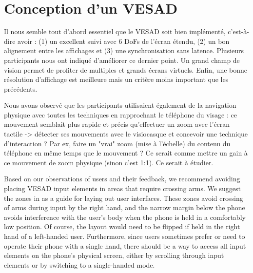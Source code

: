 

\section{Conception d'un VESAD}
\label{sec:discussion_consequences}

Il nous semble tout d'abord essentiel que le VESAD soit bien implémenté, c'est-à-dire avoir : (1) un excellent suivi avec 6 DoFs de l'écran étendu, (2) un bon alignement entre les affichages et (3) une synchronisation sans latence. Plusieurs participants nous ont indiqué d'améliorer ce dernier point. Un grand champ de vision permet de profiter de multiples et grands écrans virtuels. Enfin, une bonne résolution d'affichage est meilleure mais un critère moins important que les précédents.

Nous avons observé que les participants utilisaient également de la navigation physique avec toutes les techniques en rapprochant le téléphone du visage : ce mouvement semblait plus rapide et précis qu'effectuer un zoom avec l'écran tactile -> détecter ses mouvements avec le visiocasque et concevoir une technique d'interaction ? Par ex, faire un "vrai" zoom (mise à l'échelle) du contenu du téléphone en même temps que le mouvement ? Ce serait comme mettre un gain à ce mouvement de zoom physique (sinon c'est 1:1). Ce serait à étudier.

Based on our observations of users and their feedback, we recommend avoiding placing VESAD input elements in areas that require crossing arms. We suggest the zones in  as a guide for laying out user interfaces. These zones avoid crossing of arms during input by the right hand, and the narrow margin below the phone avoids interference with the user's body when the phone is held in a comfortably low position. Of course, the layout would need to be flipped if held in the right hand of a left-handed user. Furthermore, since users sometimes prefer or need to operate their phone with a single hand, there should be a way to access all input elements on the phone's physical screen, either by scrolling through input elements or by switching to a single-handed mode.


